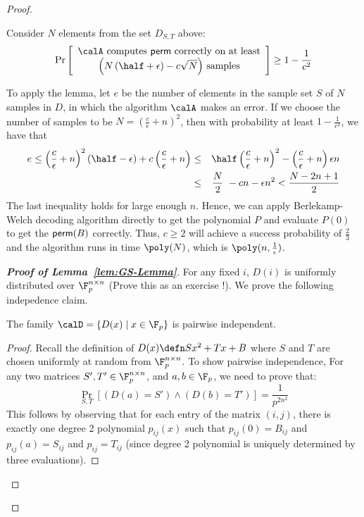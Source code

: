\begin{proof}
\begin{lemma}
\label{lem:GS-Lemma}
Consider $N$ elements from the set $D_{S,T}$ above:
$$\Pr \left[ \begin{array}{c}
\textrm{$\calA$ computes {\sf perm} correctly on at least}\\
\textrm{$\left(N \left(\half+\epsilon\right)-c\sqrt{N}\right)$ samples} 
\end{array}
\right] \ge 1-\frac{1}{c^2}$$
\end{lemma}
To apply the lemma, let $e$ be the number of elements in the sample set $S$ of $N$ samples in $D$, in which the algorithm $\calA$ makes an error. If we choose the number of samples to be $N = (\frac{c}{\epsilon}+n)^2$, then with probability at least $1-\frac{1}{c^2}$, we have that 
\begin{eqnarray}
e \le \left(\frac{c}{\epsilon}+n\right)^2\left(\half-\epsilon\right)+ c\left(\frac{c}{\epsilon}+n\right) & \le & \half\left(\frac{c}{\epsilon}+n\right)^2 - \left(\frac{c}{\epsilon}+n\right) \epsilon n \\
& \le & \frac{N}{2}\ - cn - \epsilon n^2 < \frac{N-2n+1}{2}
\end{eqnarray}
The last inequality holds for large enough $n$. Hence, we can apply Berlekamp-Welch decoding algorithm directly to get the polynomial $P$ and evaluate $P(0)$ to get the ${\sf perm}(B)$ correctly. Thus, $c \ge 2$ will achieve a success probability of $\frac{2}{3}$ and the algorithm runs in time $\poly(N)$, which is $\poly(n,\frac{1}{\epsilon})$.

\begin{proof}[\textit{\bf Proof of Lemma~\ref{lem:GS-Lemma}}]
For any fixed $i$, $D(i)$ is uniformly distributed over $\F_p^{n \times n}$ (Prove this as an exercise !). We prove the following indepedence claim.

\begin{claim}
The family $\calD = \{ D(x) \mid x \in \F_p \}$
is pairwise independent.
\end{claim}
\begin{proof}
Recall the definition of $D(x) \defn Sx^2 + Tx + B$ where $S$ and $T$ are chosen uniformly at random from $\F_p^{n \times n}$. To show pairwise independence, 
For any two matrices $S',T' \in \F_p^{n \times n}$, and $a,b \in \F_p$, we need to prove that:
$$\Pr_{S,T} \left[ (D(a) = S') \land (D(b) = T') \right] = \frac{1}{p^{2n^2}}$$
This follows by observing that for each entry of the matrix $(i,j)$, there is exactly one degree 2 polynomial $p_{ij}(x)$ such that $p_{ij}(0) = B_{ij}$ and $p_{ij}(a) = S_{ij}$ and $p_{ij} = T_{ij}$ (since degree 2 polynomial is uniquely determined by three evaluations).
\end{proof}


\end{proof}
\end{proof}
